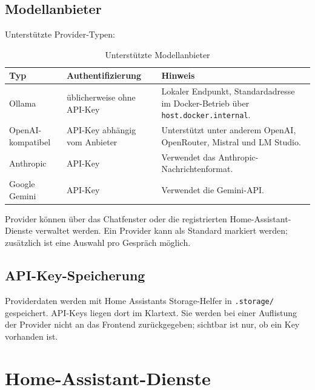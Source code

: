 \documentclass[
  11pt,
  a4paper,
  oneside,
  parskip=half
]{scrreprt}
\newcommand{\code}[1]{\texttt{#1}}
\begin{document}
\section{Modellanbieter}

Unterstützte Provider-Typen:

\begin{table}[htbp]
  \centering
  \begin{tabularx}{\textwidth}{@{}L{38mm}L{45mm}Y@{}}
    \toprule
    \textbf{Typ} & \textbf{Authentifizierung} & \textbf{Hinweis} \\
    \midrule
    Ollama & üblicherweise ohne API-Key & Lokaler Endpunkt, Standardadresse im
    Docker-Betrieb über \code{host.docker.internal}. \\
    OpenAI-kompatibel & API-Key abhängig vom Anbieter & Unterstützt unter anderem
    OpenAI, OpenRouter, Mistral und LM Studio. \\
    Anthropic & API-Key & Verwendet das Anthropic-Nachrichtenformat. \\
    Google Gemini & API-Key & Verwendet die Gemini-API. \\
    \bottomrule
  \end{tabularx}
  \caption{Unterstützte Modellanbieter}
\end{table}

Provider können über das Chatfenster oder die registrierten Home-Assistant-Dienste
verwaltet werden. Ein Provider kann als Standard markiert werden; zusätzlich ist eine
Auswahl pro Gespräch möglich.

\section{API-Key-Speicherung}

Providerdaten werden mit Home Assistants Storage-Helfer in \code{.storage/} gespeichert.
API-Keys liegen dort im Klartext. Sie werden bei einer Auflistung der Provider nicht an
das Frontend zurückgegeben; sichtbar ist nur, ob ein Key vorhanden ist.

\chapter{Home-Assistant-Dienste}
\end{document}
